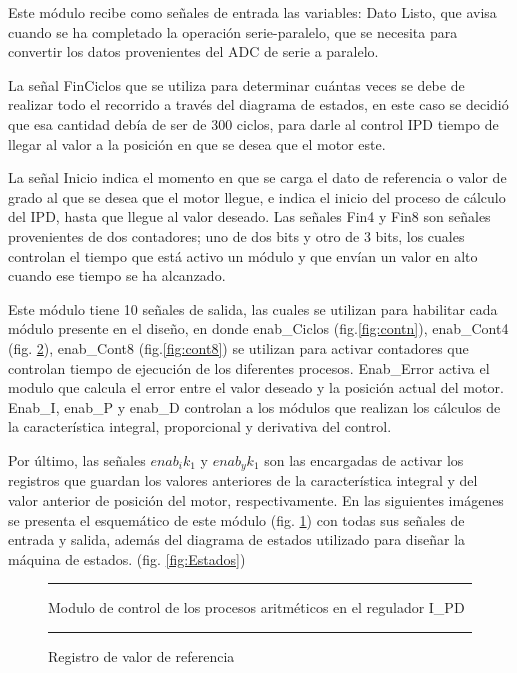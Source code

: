 \documentclass[12pt,a4paper]{article} %
\begin{document}
Este módulo recibe como señales de entrada las  variables: Dato Listo, que avisa cuando se ha completado la operación serie-paralelo, que se necesita para convertir los datos provenientes del ADC de serie a paralelo. 

La señal FinCiclos que se utiliza para determinar cuántas veces se debe de realizar todo el recorrido a través del diagrama de estados, en este caso se decidió que esa cantidad debía de ser de 300 ciclos, para darle al control IPD tiempo de llegar al valor a la posición en que se desea que el motor este. 

La señal Inicio indica el momento en que se carga el dato de referencia o valor de grado al que se desea que el motor llegue, e indica el inicio del proceso de cálculo del IPD, hasta que llegue  al valor deseado. Las señales Fin4 y Fin8 son señales provenientes de dos contadores; uno de dos bits y otro de 3 bits, los cuales controlan el tiempo que  está activo un módulo y que envían un valor en alto cuando ese tiempo se ha alcanzado. 

Este  módulo tiene 10 señales de salida, las cuales se utilizan para habilitar cada módulo presente en el diseño, en donde enab\_Ciclos (fig.\ref{fig:contn}), enab\_Cont4 (fig. \ref{fig:cont4}), enab\_Cont8 (fig.\ref{fig:cont8}) se utilizan para activar contadores que controlan tiempo de ejecución de los diferentes procesos. Enab\_Error activa el modulo que calcula el error entre el valor deseado y la posición actual del motor. Enab\_I, enab\_P y enab\_D controlan a los módulos que realizan los cálculos de la característica integral, proporcional y derivativa del control. 

Por último, las señales $enab_ik_1$ y $enab_yk_1$ son las encargadas de activar los registros que guardan los valores anteriores de la característica integral y del valor anterior de posición del motor, respectivamente. En las siguientes imágenes se presenta el esquemático de este módulo (fig. \ref{fig:MaqIPD}) con todas sus señales de entrada y salida, además del diagrama de estados utilizado para diseñar la máquina de estados. (fig. \ref{fig:Estados})

\begin{figure}[htbp]
  \centering
    \rule{35em}{0.3pt}
  \caption[REF]{Modulo de control de los procesos aritméticos en el regulador I\_PD}
  \label{fig:MaqIPD}
\end{figure}

\begin{figure}[htbp]
  \centering
    \rule{35em}{0.3pt}
  \caption[cont4]{Registro de valor de referencia}
  \label{fig:cont4}
\end{figure}
\end{document}
